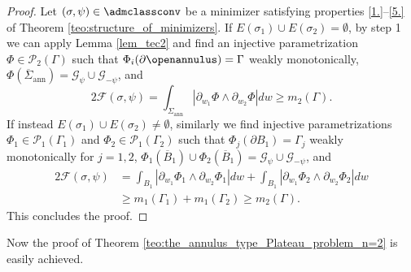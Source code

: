 \begin{proof}
Let $(\sigma,\psi)\in\admclassconv$ be a minimizer satisfying
properties
\ref{1.}--\ref{5.} of
Theorem \ref{teo:structure_of_minimizers}.
If $E(\sigma_1)\cup E(\sigma_2)=\emptyset$, by step 1 we can apply Lemma \ref{lem_tec2} and find an injective parametrization
$\Phi\in \mathcal P_2(\Gamma)$ such that
$\Phi_i(\partial \openannulus)=\Gamma$ weakly monotonically,
$\Phi(\overline\Sigma_\mathrm{ann})=\mathcal G_\psi\cup \mathcal G_{-\psi}$, and
\[
2\mathcal{F}(\sigma,\psi)=\int_{\Sigma_\mathrm{ann}}|\partial_{w_1}\Phi\wedge\partial_{w_2}\Phi|dw\geq m_2(\Gamma).
\]
If instead $E(\sigma_1)\cup E(\sigma_2)\ne\emptyset$, similarly we find injective parametrizations
$\Phi_1\in \mathcal P_1(\Gamma_1)$ and $\Phi_2\in \mathcal P_1(\Gamma_2) $
such that $\Phi_j(\partial B_1)=\Gamma_j$ weakly monotonically
for $j=1,2$, $\Phi_1(\overline B_1)\cup\Phi_2(\overline B_1)=\mathcal G_\psi\cup \mathcal G_{-\psi}$, and
\begin{align*}
2\mathcal{F}(\sigma,\psi)&=\int_{B_{1}}|\partial_{w_1}\Phi_1\wedge\partial_{w_2}\Phi_1|dw+\int_{B_{1}}|\partial_{w_1}\Phi_2\wedge\partial_{w_2}\Phi_2|dw\\&\geq m_1(\Gamma_1)+ m_1(\Gamma_2)\ge m_2(\Gamma).
\end{align*}
This concludes the proof.
\end{proof}

Now the proof of Theorem \ref{teo:the_annulus_type_Plateau_problem_n=2} is easily achieved.

